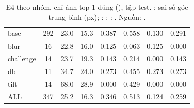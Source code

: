 \begin{table}[htbp]
\centering
\caption[E4 theo nhóm, ảnh top-1 đúng (test)]{E4 theo nhóm, chỉ ảnh top-1 đúng (), tập test. : sai số góc trung bình (px); : ; : . Nguồn: .}
\label{tab:e4sub}
\footnotesize
\setlength{\tabcolsep}{3pt}
\begin{tabularx}{\textwidth}{lCCCCCCC}
\hline
{}  &  &  &  &  &  &  &  \\
\hline
base & 292 & 23.0 & 15.3 & 0.387 & 0.558 & 0.130 & 0.291 \\
blur & 16 & 22.8 & 16.0 & 0.125 & 0.063 & 0.125 & 0.000 \\
challenge & 14 & 23.7 & 19.3 & 0.143 & 0.214 & 0.000 & 0.143 \\
db & 11 & 34.7 & 24.0 & 0.273 & 0.455 & 0.273 & 0.273 \\
tilt & 14 & 68.0 & 28.9 & 0.000 & 0.429 & 0.000 & 0.000 \\
ALL & 347 & 25.2 & 16.3 & 0.346 & 0.513 & 0.124 & 0.259 \\
\hline
\end{tabularx}
\end{table}
